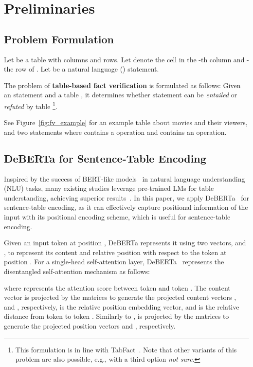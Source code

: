 \documentclass[11pt]{article}
\newcommand{\eg}{{e.g.,}\xspace}
\newcommand{\term}[1]{\xspace}
\begin{document}
%
 \section{Preliminaries}



\subsection{Problem Formulation}
Let  be a table with  columns and  rows. 
Let  denote the cell in the -th column and -the row of . 
Let  be a natural language (\term{NL}) statement. 

The problem of \textbf{table-based fact verification} is formulated as follows: Given an \term{NL} statement  and a table , it determines whether statement  can be \emph{entailed} or \emph{refuted} by table \footnote{This formulation is in line with TabFact~\cite{tabfact}. Note that other variants of this problem are also possible, \eg with a third option {\em not sure}.}.

See Figure~\ref{fig:fv_example} for an example table about movies and their viewers, and two statements where  contains a \term{Comparative} operation and  contains an \term{Aggregation} operation.





\subsection{DeBERTa for Sentence-Table Encoding}
\label{sec:deberta}

Inspired by the success of BERT-like models~\cite{bert,roberta,electra} in natural language understanding (NLU) tasks, many existing studies leverage pre-trained LMs for table understanding, achieving superior results~\cite{tabsearch,joint}.
In this paper, we apply DeBERTa~\cite{deberta} for sentence-table encoding, as it can effectively capture positional information of the input with its positional encoding scheme, which is useful for sentence-table encoding.

Given an input token at position , DeBERTa represents it using two vectors,  and , to represent its content and relative position with respect to the token at position . For a single-head self-attention layer, DeBERTa~\cite{deberta} represents the disentangled self-attention mechanism as follows:

where  represents the attention score between token  and token .
The content vector  is projected by the matrices  to generate the projected content vectors ,  and , respectively,
 is the relative position embedding vector, and  is the relative distance from token  to token .
Similarly to ,  is projected by the matrices  to generate the projected position vectors  and , respectively. 
\end{document}
